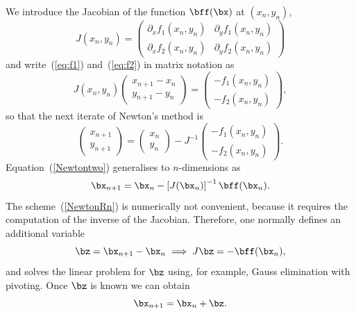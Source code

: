 %
We introduce the Jacobian of the function $\bff(\bx)$ at $(x_n,y_n)$,
%
\begin{equation*}
  J(x_n,y_n) =
  \begin{pmatrix}
    \partial_x f_1(x_n,y_n) & \partial_y f_1(x_n,y_n) \\
    \partial_x f_2(x_n,y_n) & \partial_y f_2(x_n,y_n)
  \end{pmatrix}
\end{equation*}
%
and write~(\ref{eq:f1}) and~(\ref{eq:f2}) in matrix notation as
%
\begin{equation*}
  J(x_n,y_n)
  \begin{pmatrix}
    x_{n+1} - x_n \\ y_{n+1} - y_n
  \end{pmatrix}
  =
  \begin{pmatrix}
    - f_1(x_n,y_n) \\ - f_2(x_n,y_n)
  \end{pmatrix}
  ,
\end{equation*}
%
so that the next iterate of Newton's method is
%
\begin{equation}
  \begin{pmatrix}
    x_{n+1} \\ y_{n+1}
  \end{pmatrix}
 =
 \begin{pmatrix}
   x_n \\ y_n
 \end{pmatrix}
 - J^{-1}
 \begin{pmatrix}
   -f_1(x_n,y_n) \\ -f_2(x_n,y_n)
 \end{pmatrix}
 . \label{Newtontwo}
\end{equation}
%
Equation~(\ref{Newtontwo}) generalises to $n$-dimensions as
%
\begin{equation}
  \bx_{n+1} = \bx_{n} -
  \left [ J(\bx_n) \right ]^{-1} \bff(\bx_n) . \label{NewtonRn}
\end{equation}
%
The scheme~(\ref{NewtonRn}) is numerically not convenient, because it
requires the computation of the inverse of the Jacobian.  Therefore,
one normally defines an additional variable
%
\begin{equation*}
  \bz = \bx_{n+1} - \bx_n \implies J \bz = - \bff(\bx_n) ,
\end{equation*}
%
and solves the linear problem for $\bz$ using, for example, Gauss
elimination with pivoting.  Once $\bz$ is known we can obtain
%
\begin{equation*}
  \bx_{n+1} = \bx_n + \bz .
\end{equation*}

